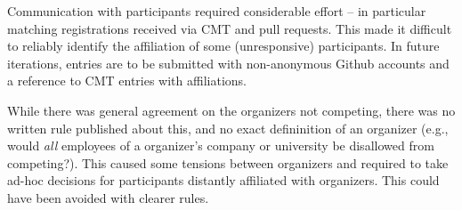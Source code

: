 
Communication with participants required considerable effort -- in particular matching registrations received via CMT 
and pull requests. 
%
This made it difficult to reliably identify the affiliation of some (unresponsive) participants. 
%
In future iterations, entries are to be submitted with non-anonymous Github accounts and a reference to CMT entries with affiliations.


While there was general agreement on the organizers not competing,
there was no written rule published about this, and no exact defininition of an organizer
(e.g., would \emph{all} employees of a organizer's  company or university be disallowed from competing?). 
%
This caused some tensions between organizers and required to take ad-hoc decisions for participants distantly affiliated with organizers. 
%
This could have been avoided with clearer rules. 